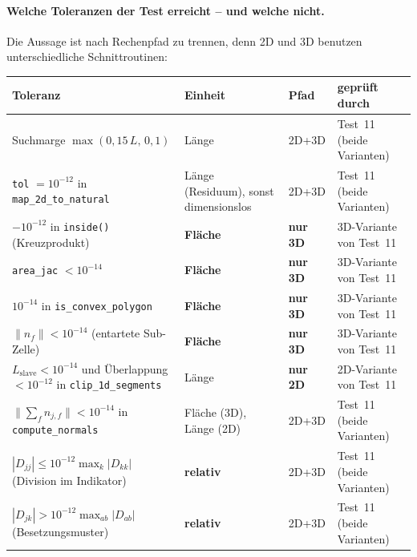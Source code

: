 \documentclass[a4paper,11pt]{article}
\def\bm#1{#1}%
\def\tilde#1{#1}%
\newcommand{\code}[1]{\texttt{\small #1}}
\begin{document}
\paragraph{Welche Toleranzen der Test erreicht -- und welche nicht.} Die Aussage ist nach
Rechenpfad zu trennen, denn 2D und 3D benutzen unterschiedliche Schnittroutinen:

\begin{center}
\small
\begin{tabularx}{\linewidth}{>{\raggedright\arraybackslash}p{5.6cm}>{\raggedright\arraybackslash}p{2.4cm}lX}
\toprule
Toleranz & Einheit & Pfad & geprüft durch \\
\midrule
Suchmarge $\max(0{,}15\,L,\,0{,}1)$ & Länge & 2D+3D & Test~11 (beide Varianten) \\
\code{tol} $=10^{-12}$ in \code{map\_2d\_to\_natural} & Länge (Residuum), sonst dimensionslos & 2D+3D & Test~11 (beide Varianten) \\
$-10^{-12}$ in \code{inside()} (Kreuzprodukt) & \textbf{Fläche} & \textbf{nur 3D} & 3D-Variante von Test~11 \\
\code{area\_jac} $<10^{-14}$ & \textbf{Fläche} & \textbf{nur 3D} & 3D-Variante von Test~11 \\
$10^{-14}$ in \code{is\_convex\_polygon} & \textbf{Fläche} & \textbf{nur 3D} & 3D-Variante von Test~11 \\
$\|\bm n_f\|<10^{-14}$ (entartete Sub-Zelle) & \textbf{Fläche} & \textbf{nur 3D} & 3D-Variante von Test~11 \\
$L_{\text{slave}}<10^{-14}$ und Überlappung $<10^{-12}$ in \code{clip\_1d\_segments} & Länge & \textbf{nur 2D} & 2D-Variante von Test~11 \\
$\|\sum_f \bm n_{j,f}\|<10^{-14}$ in \code{compute\_normals} & Fläche (3D), Länge (2D) & 2D+3D & Test~11 (beide Varianten) \\
$|\tilde D_{jj}|\le10^{-12}\max_k|\tilde D_{kk}|$ (Division im Indikator) & \textbf{relativ} & 2D+3D & Test~11 (beide Varianten) \\
$|D_{jk}|>10^{-12}\max_{ab}|D_{ab}|$ (Besetzungsmuster) & \textbf{relativ} & 2D+3D & Test~11 (beide Varianten) \\
\bottomrule
\end{tabularx}
\end{center}
\end{document}
